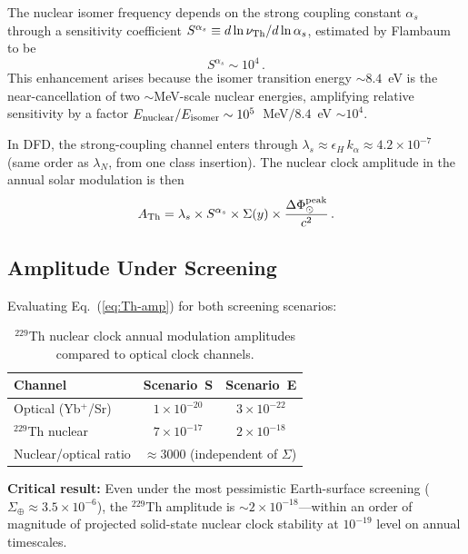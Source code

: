\documentclass[twocolumn,showpacs,preprintnumbers,amsmath,amssymb,prd]{revtex4-2}
\newcommand{\kalpha}{k_\alpha}
\begin{document}
The nuclear isomer frequency depends on the strong coupling
constant $\alpha_s$ through a sensitivity coefficient
$S^{\alpha_s} \equiv d\ln\nu_{\rm Th}/d\ln\alpha_s$,
estimated by Flambaum~\cite{Flambaum2006} to be
\begin{equation}\label{eq:S-alpha-s}
S^{\alpha_s} \sim 10^4\,.
\end{equation}
This enhancement arises because the isomer transition energy
$\sim 8.4$~eV is the near-cancellation of two $\sim$MeV-scale
nuclear energies, amplifying relative sensitivity by a factor
$E_{\rm nuclear}/E_{\rm isomer} \sim 10^5$~MeV$/8.4$~eV $\sim 10^4$.

In DFD, the strong-coupling channel enters through
$\lambda_s \approx \epsilon_H \, \kalpha \approx 4.2 \times 10^{-7}$
(same order as $\lambda_N$, from one class insertion).  The nuclear
clock amplitude in the annual solar modulation is then
\begin{equation}\label{eq:Th-amp}
A_{\rm Th} = \lambda_s \times S^{\alpha_s} \times \Sigma(y) \times
\frac{\Delta\Phi_\odot^{\rm peak}}{c^2}\,.
\end{equation}

\subsection{Amplitude Under Screening}

Evaluating Eq.~(\ref{eq:Th-amp}) for both screening scenarios:

\begin{table}[h]
\centering
\caption{$^{229}$Th nuclear clock annual modulation amplitudes
compared to optical clock channels.}
\label{tab:nuclear-amplitudes}
\renewcommand{\arraystretch}{1.15}
\small
\begin{tabular}{@{}lcc@{}}
\toprule
Channel & Scenario~S & Scenario~E \\
\midrule
Optical (Yb$^+$/Sr) & $1 \times 10^{-20}$ & $3 \times 10^{-22}$ \\
$^{229}$Th nuclear & $7 \times 10^{-17}$ & $2 \times 10^{-18}$ \\
\midrule
Nuclear/optical ratio & \multicolumn{2}{c}{$\approx 3000$ (independent of $\Sigma$)} \\
\bottomrule
\end{tabular}
\end{table}

\textbf{Critical result:} Even under the most pessimistic
Earth-surface screening ($\Sigma_\oplus \approx 3.5 \times 10^{-6}$),
the $^{229}$Th amplitude is $\sim 2 \times 10^{-18}$---within
an order of magnitude of projected solid-state nuclear clock
stability at $10^{-19}$ level on annual timescales.
\end{document}
